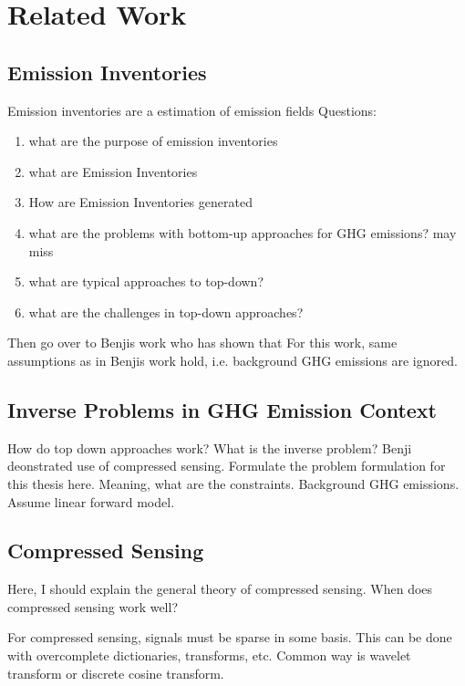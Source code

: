 
\chapter{Related Work}\label{chapter:related_work}

\section{Emission Inventories}
Emission inventories are a estimation of emission fields
Questions:
\begin{enumerate}
    \item what are the purpose of emission inventories
    \item what are Emission Inventories
    \item How are Emission Inventories generated
    \item what are the problems with bottom-up approaches for GHG emissions? 
    \subitem may miss
    \item what are typical approaches to top-down?
    \item what are the challenges in top-down approaches?
\end{enumerate}
Then go over to Benjis work who has shown that 
For this work, same assumptions as in Benjis work hold, i.e. background GHG emissions are ignored.

\section{Inverse Problems in GHG Emission Context}
How do top down approaches work?
What is the inverse problem?
Benji deonstrated use of compressed sensing.
Formulate the problem formulation for this thesis here.
Meaning, what are the constraints.
Background GHG emissions.
Assume linear forward model.

\section{Compressed Sensing}
Here, I should explain the general theory of compressed sensing.
When does compressed sensing work well?

For compressed sensing, signals must be sparse in some basis.
This can be done with overcomplete dictionaries, transforms, etc.
Common way is wavelet transform or discrete cosine transform.

